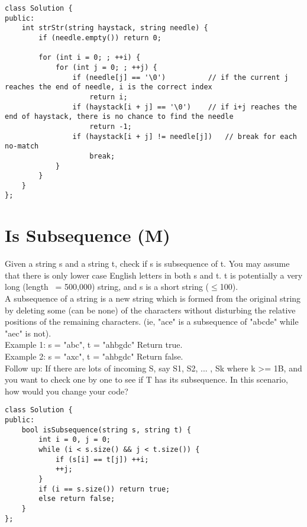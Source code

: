 \begin{lstlisting}
class Solution {
public:
    int strStr(string haystack, string needle) {
        if (needle.empty()) return 0;

        for (int i = 0; ; ++i) {
            for (int j = 0; ; ++j) {
                if (needle[j] == '\0')          // if the current j reaches the end of needle, i is the correct index
                    return i;
                if (haystack[i + j] == '\0')    // if i+j reaches the end of haystack, there is no chance to find the needle
                    return -1;
                if (haystack[i + j] != needle[j])   // break for each no-match
                    break;
            }
        }
    }
};
\end{lstlisting}


\section{Is Subsequence (M)}
Given a string s and a string t, check if s is subsequence of t. You may assume that there is only lower case English letters in both s and t. t is potentially a very long (length ~= 500,000) string, and s is a short string ($\leq$100).\\

A subsequence of a string is a new string which is formed from the original string by deleting some (can be none) of the characters without disturbing the relative positions of the remaining characters. (ie, "ace" is a subsequence of "abcde" while "aec" is not).\\

Example 1:
s = "abc", t = "ahbgdc"
Return true.\\

Example 2:
s = "axc", t = "ahbgdc"
Return false.\\

Follow up:
If there are lots of incoming S, say S1, S2, ... , Sk where k >= 1B, and you want to check one by one to see if T has its subsequence. In this scenario, how would you change your code?\\

\begin{lstlisting}
class Solution {
public:
    bool isSubsequence(string s, string t) {
        int i = 0, j = 0;
        while (i < s.size() && j < t.size()) {
            if (s[i] == t[j]) ++i;
            ++j;
        }
        if (i == s.size()) return true;
        else return false;
    }
};
\end{lstlisting}


